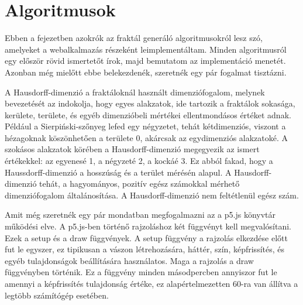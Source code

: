\chapter*{Algoritmusok}
Ebben a fejezetben azokrók az fraktál generáló algoritmusokról lesz szó, amelyeket a webalkalmazás részeként leimplementáltam. Minden algoritmusról egy először rövid ismertetőt írok, majd bemutatom az implementáció menetét. Azonban még mielőtt ebbe belekezdenék, szeretnék egy pár fogalmat tisztázni.
\par A Hausdorff-dimenzió a fraktáloknál használt dimenziófogalom, melynek bevezetését az indokolja, hogy egyes alakzatok, ide tartozik a fraktálok sokasága, kerülete, területe, és egyéb dimenzióbeli mértékei ellentmondásos értéket adnak. Például a Sierpiński-szőnyeg lefed egy négyzetet, tehát kétdimenziós, viszont a hézagoknak köszönhetően a területe 0, akárcsak az egydimenziós alakzatoké. A szokásos alakzatok körében a Hausdorff-dimenzió megegyezik az ismert értékekkel: az egyenesé 1, a négyzeté 2, a kockáé 3. Ez abból fakad, hogy a Haussdorff-dimenzió a hosszúság és a terület mérésén alapul. A Hausdorff-dimenzió tehát, a hagyományos, pozitív egész számokkal mérhető dimenziófogalom általánosítása. A Hausdorff-dimenzió nem feltétlenül egész szám.
\par Amit még szeretnék egy pár mondatban megfogalmazni az a p5.js könyvtár működési elve. A p5.js-ben történő rajzoláshoz két függvényt kell megvalósítani. Ezek a setup és a draw függvények. A setup függvény a rajzolás elkezdése előtt fut le egyszer, ez tipikusan a vászon létrehozására, háttér, szín, képfrissítés, és egyéb tulajdonságok beállítására használatos. Maga a rajzolás a draw függvényben történik. Ez a függvény minden másodpercben annyiszor fut le amennyi a képfrissítés tulajdonság értéke, ez alapértelmezetten 60-ra van állítva a legtöbb számítógép esetében. 
